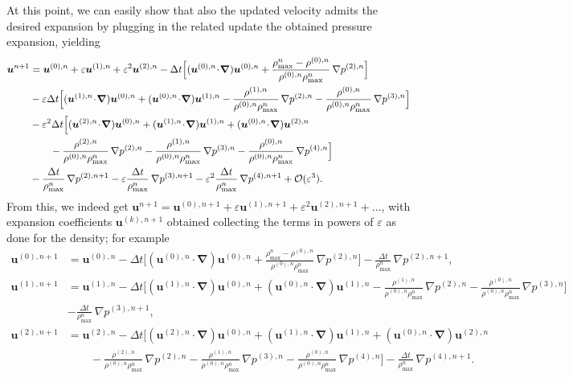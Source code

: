 \documentclass[A4paper,12pt,twoside]{article}
\newenvironment{proof}{{\flushleft \bf Proof:}}{}
\numberwithin{equation}{section}
\numberwithin{figure}{section}
\numberwithin{table}{section}
\def\bnabla{\bm{\nabla}}
\newcommand{\dt}{\Delta t}
\newcommand{\ve}{\varepsilon}
\begin{document}
\begin{proof}
At this point, we can easily show that also the updated velocity admits the desired expansion by plugging in the related update the obtained pressure expansion, yielding
$$
\begin{aligned}
\bm u^{n+1}&=\bm u^{(0),n}+\ve \bm u^{(1),n}+\ve^2 \bm u^{(2),n}-\dt \Big[(\bm u^{(0),n}\!\cdot\!\bnabla)\bm u^{(0),n}+\frac{\rho_{\max}^n-\rho^{(0),n}}{\rho^{(0),n}\rho_{\max}^n}\,\nabla p^{(2),n} \Big]
\\&-\ve\dt \Big[(\bm u^{(1),n}\!\cdot\!\bnabla)\bm u^{(0),n}+(\bm u^{(0),n}\!\cdot\!\bnabla)\bm u^{(1),n}-\frac{\rho^{(1),n}}{\rho^{(0),n}\rho_{\max}^n}\,\nabla p^{(2),n}-\frac{\rho^{(0),n}}{\rho^{(0),n}\rho_{\max}^n}\,\nabla p^{(3),n}\Big]\\
&-\ve^2\dt \Big[
(\bm u^{(2),n}\!\cdot\!\bnabla)\bm u^{(0),n}
+(\bm u^{(1),n}\!\cdot\!\bnabla)\bm u^{(1),n}
+(\bm u^{(0),n}\!\cdot\!\bnabla)\bm u^{(2),n} \\
&\qquad
-\frac{\rho^{(2),n}}{\rho^{(0),n}\rho_{\max}^n}\,\nabla p^{(2),n}
-\frac{\rho^{(1),n}}{\rho^{(0),n}\rho_{\max}^n}\,\nabla p^{(3),n}
-\frac{\rho^{(0),n}}{\rho^{(0),n}\rho_{\max}^n}\,\nabla p^{(4),n}
\Big]\\
&-\frac{\dt}{\rho_{\max}^n}\,\nabla p^{(2),n+1}-\ve \frac{\dt}{\rho_{\max}^n}\,\nabla p^{(3),n+1}-\ve^2 \frac{\dt}{\rho_{\max}^n}\,\nabla p^{(4),n+1}+{\cal O}(\ve^3).
\end{aligned}
$$
From this, we indeed get $\bm u^{n+1}= \bm u^{(0),n+1}+\ve \bm u^{(1),n+1}+\ve^2 \bm u^{(2),n+1}+\dots$, with expansion coefficients $\bm u^{(k),n+1}$ obtained collecting the terms in powers of $\ve$ as done for the density; for example
\begin{align*}
	\bm u^{(0),n+1}&=\bm u^{(0),n}-\dt \Big[(\bm u^{(0),n}\!\cdot\!\bnabla)\bm u^{(0),n}+\frac{\rho_{\max}^n-\rho^{(0),n}}{\rho^{(0),n}\rho_{\max}^n}\,\nabla p^{(2),n} \Big]-\frac{\dt}{\rho_{\max}^n}\,\nabla p^{(2),n+1},\\
	\bm u^{(1),n+1}&=\bm u^{(1),n}-\dt \Big[(\bm u^{(1),n}\!\cdot\!\bnabla)\bm u^{(0),n}+(\bm u^{(0),n}\!\cdot\!\bnabla)\bm u^{(1),n}-\frac{\rho^{(1),n}}{\rho^{(0),n}\rho_{\max}^n}\,\nabla p^{(2),n}-\frac{\rho^{(0),n}}{\rho^{(0),n}\rho_{\max}^n}\,\nabla p^{(3),n}\Big]\\
	&-\frac{\dt}{\rho_{\max}^n}\,\nabla p^{(3),n+1},\\
	\bm u^{(2),n+1}&=\bm u^{(2),n}-\dt \Big[
	(\bm u^{(2),n}\!\cdot\!\bnabla)\bm u^{(0),n}
	+(\bm u^{(1),n}\!\cdot\!\bnabla)\bm u^{(1),n}
	+(\bm u^{(0),n}\!\cdot\!\bnabla)\bm u^{(2),n} \\
	&\qquad
	-\frac{\rho^{(2),n}}{\rho^{(0),n}\rho_{\max}^n}\,\nabla p^{(2),n}
	-\frac{\rho^{(1),n}}{\rho^{(0),n}\rho_{\max}^n}\,\nabla p^{(3),n}
	-\frac{\rho^{(0),n}}{\rho^{(0),n}\rho_{\max}^n}\,\nabla p^{(4),n}
	\Big]-\frac{\dt}{\rho_{\max}^n}\,\nabla p^{(4),n+1}.
\end{align*}



\end{proof}
\end{document}
